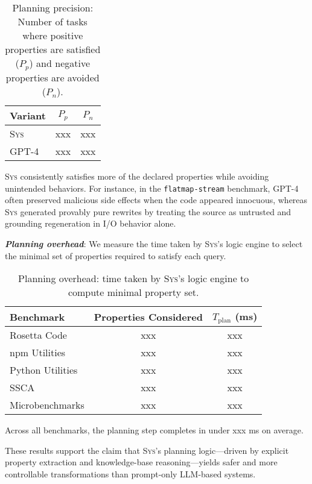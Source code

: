 \documentclass[sigplan]{acmart}
\newcommand{\sys}{{\scshape Sys}\xspace}
\newcommand{\heading}[1]{\vspace{2pt}\noindent\textbf{\emph{#1}}:\enspace}
\newcommand{\xxx}{\colorbox{red!30}{xxx}\xspace}
\begin{document}
\begin{table}[h]
  \centering
  \caption{
    Planning precision: Number of tasks where positive properties are satisfied ($P_p$) and negative properties are avoided ($P_n$).
  }
  \begin{tabular}{lcc}
    \toprule
    Variant & $P_{p}$ & $P_{n}$  \\
    \midrule
    \sys & \xxx & \xxx \\
    GPT-4 & \xxx & \xxx \\
    \bottomrule
  \end{tabular}
\end{table}

\sys consistently satisfies more of the declared properties while avoiding unintended behaviors. For instance, in the \texttt{flatmap-stream} benchmark, GPT-4 often preserved malicious side effects when the code appeared innocuous, whereas \sys generated provably pure rewrites by treating the source as untrusted and grounding regeneration in I/O behavior alone.

\heading{Planning overhead}
We measure the time taken by \sys's logic engine to select the minimal set of
properties required to satisfy each query. 
\begin{table}[h]
  \centering
  \caption{Planning overhead: time taken by \sys's logic engine to compute minimal property set.}
  \begin{tabular}{lcc}
    \toprule
    Benchmark & Properties Considered & $T_{\text{plan}}$ (ms) \\
    \midrule
    Rosetta Code & \xxx & \xxx \\
    npm Utilities & \xxx & \xxx \\
    Python Utilities & \xxx & \xxx \\
    SSCA & \xxx & \xxx \\
    Microbenchmarks & \xxx & \xxx \\
    \bottomrule
  \end{tabular}
\end{table}

Across all benchmarks, the planning step completes in under \xxx ms on average.

These results support the claim that \sys's planning logic---driven by explicit
property extraction and knowledge-base reasoning---yields safer and more
controllable transformations than prompt-only LLM-based systems.
\end{document}
